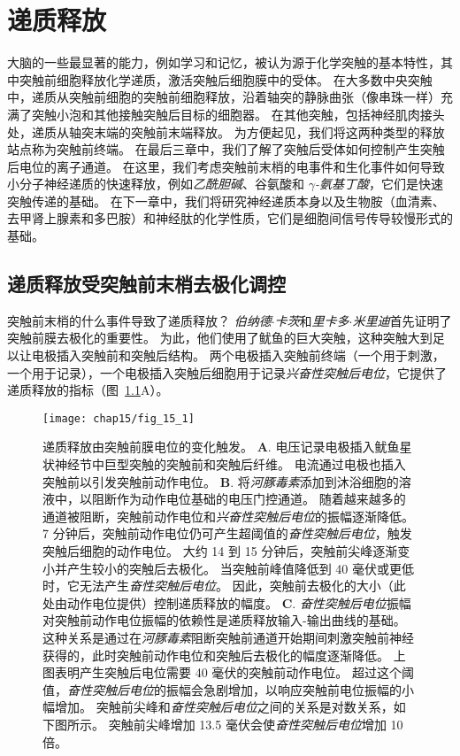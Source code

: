 \chapter{递质释放} \label{chap:chap15}

大脑的一些最显著的能力，例如学习和记忆，被认为源于化学突触的基本特性，其中突触前细胞释放化学递质，激活突触后细胞膜中的受体。
在大多数中央突触中，递质从突触前细胞的突触前细胞释放，沿着轴突的静脉曲张（像串珠一样）充满了突触小泡和其他接触突触后目标的细胞器。
在其他突触，包括神经肌肉接头处，递质从轴突末端的突触前末端释放。
为方便起见，我们将这两种类型的释放站点称为突触前终端。
在最后三章中，我们了解了突触后受体如何控制产生突触后电位的离子通道。
在这里，我们考虑突触前末梢的电事件和生化事件如何导致小分子神经递质的快速释放，例如\textit{乙酰胆碱}、谷氨酸和 \textit{$\gamma$-氨基丁酸}，它们是快速突触传递的基础。
在下一章中，我们将研究神经递质本身以及生物胺（血清素、去甲肾上腺素和多巴胺）和神经肽的化学性质，它们是细胞间信号传导较慢形式的基础。



\section{递质释放受突触前末梢去极化调控}

突触前末梢的什么事件导致了递质释放？
\textit{伯纳德$\cdot$卡茨}和\textit{里卡多$\cdot$米里迪}首先证明了突触前膜去极化的重要性。
为此，他们使用了鱿鱼的巨大突触，这种突触大到足以让电极插入突触前和突触后结构。
两个电极插入突触前终端（一个用于刺激，一个用于记录），一个电极插入突触后细胞用于记录\textit{兴奋性突触后电位}，它提供了递质释放的指标（图~\ref{fig:15_1}A）。


\begin{figure}[htbp]
	\centering
	\texttt{[image: chap15/fig\_15\_1]}
	\caption{递质释放由突触前膜电位的变化触发\cite{katz1967study}。
	\textbf{A}. 电压记录电极插入鱿鱼星状神经节中巨型突触的突触前和突触后纤维。
	电流通过电极也插入突触前以引发突触前动作电位。
	\textbf{B}. 将\textit{河豚毒素}添加到沐浴细胞的溶液中，以阻断作为动作电位基础的电压门控通道。
	随着越来越多的通道被阻断，突触前动作电位和\textit{兴奋性突触后电位}的振幅逐渐降低。
	7 分钟后，突触前动作电位仍可产生超阈值的\textit{奋性突触后电位}，触发突触后细胞的动作电位。
	大约 14 到 15 分钟后，突触前尖峰逐渐变小并产生较小的突触后去极化。
	当突触前峰值降低到 40 毫伏或更低时，它无法产生\textit{奋性突触后电位}。
	因此，突触前去极化的大小（此处由动作电位提供）控制递质释放的幅度。
	\textbf{C}. \textit{奋性突触后电位}振幅对突触前动作电位振幅的依赖性是递质释放输入-输出曲线的基础。
	这种关系是通过在\textit{河豚毒素}阻断突触前通道开始期间刺激突触前神经获得的，此时突触前动作电位和突触后去极化的幅度逐渐降低。
	上图表明产生突触后电位需要 40 毫伏的突触前动作电位。
	超过这个阈值，\textit{奋性突触后电位}的振幅会急剧增加，以响应突触前电位振幅的小幅增加。
	突触前尖峰和\textit{奋性突触后电位}之间的关系是对数关系，如下图所示。
	突触前尖峰增加 13.5 毫伏会使\textit{奋性突触后电位}增加 10 倍。}
	\label{fig:15_1}
\end{figure}


